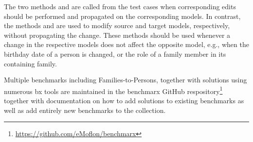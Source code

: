 The two methods  and  are called from the test cases when corresponding edits should be performed and propagated on the corresponding models. 
In contrast, the methods  and  are used to modify source and target models, respectively, without propagating the change.
These methods should be used whenever a change in the respective models does not affect the opposite model, e.g., when the birthday date of a person is changed, or the role of a family member in its containing family.

Multiple benchmarks including Families-to-Persons, together with solutions using numerous bx tools are maintained in the benchmarx GitHub respository\footnote{\url{https://github.com/eMoflon/benchmarx}} together with documentation on how to add solutions to existing benchmarks as well as add entirely new benchmarks to the collection.
